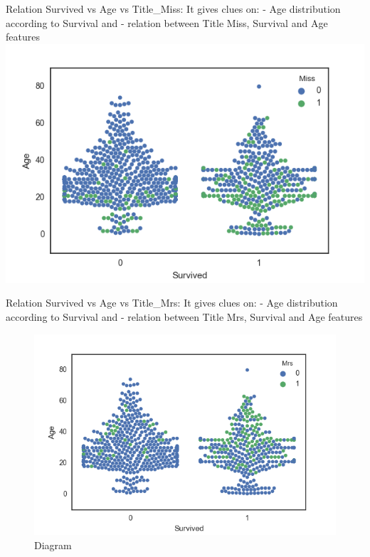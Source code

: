 \documentclass[11pt]{article}
\makeatletter
\def\maxwidth{\ifdim\Gin@nat@width>\linewidth\linewidth
    \else\Gin@nat@width\fi}
\let\Oldincludegraphics\includegraphics
\renewcommand{\includegraphics}[1]{\Oldincludegraphics[width=.8\maxwidth]{#1}}
\makeatother
\begin{document}
    Relation Survived vs Age vs Title\_Miss: It gives clues on: - Age
distribution according to Survival and - relation between Title Miss,
Survival and Age features \includegraphics{SexFactorv2.png}

    Relation Survived vs Age vs Title\_Mrs: It gives clues on: - Age
distribution according to Survival and - relation between Title Mrs,
Survival and Age features

\begin{figure}
\centering
\includegraphics{SexFactorv3.png}
\caption{Diagram}
\end{figure}
\end{document}
